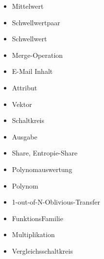 \documentclass{article}
\begin{document}
\begin{multicols}{2}
\begin{itemize}
\item Mittelwert
\item Schwellwertpaar
\item Schwellwert
\item Merge-Operation
\item E-Mail Inhalt
\item Attribut
\item Vektor
\item Schaltkreis
\item Ausgabe
\item Share, Entropie-Share
\item Polynomauswertung
\item Polynom
\item 1-out-of-N-Oblivious-Transfer
\item FunktionsFamilie
\item Multiplikation
\item Vergleichsschaltkreis
\end{itemize}
\end{multicols}
\pagebreak
\end{document}

